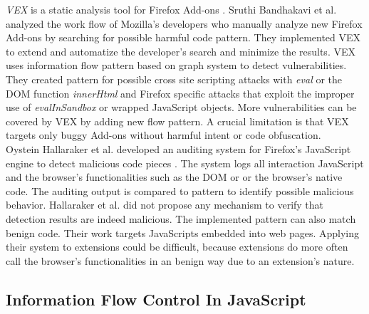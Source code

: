 		\textit{VEX} is a static analysis tool for Firefox Add-ons \cite{Bandhakavi:2011:VBE:1995376.1995398}. Sruthi Bandhakavi et al. analyzed the work flow of Mozilla's developers who manually analyze new Firefox Add-ons by searching for possible harmful code pattern. They implemented VEX to extend and automatize the developer's search and minimize the results. VEX uses information flow pattern based on graph system to detect vulnerabilities. They created pattern for possible cross site scripting attacks with \textit{eval} or the DOM function \textit{innerHtml} and Firefox specific attacks that exploit the improper use of \textit{evalInSandbox} or wrapped JavaScript objects. More vulnerabilities can be covered by VEX by adding new flow pattern. A crucial limitation is that VEX targets only buggy Add-ons without harmful intent or code obfuscation. \\
		
		Oystein Hallaraker et al. developed an auditing system for Firefox's JavaScript engine to detect malicious code pieces \cite{Hallaraker:2005:DMJ:1078029.1078861}. The system logs all interaction JavaScript and the browser's functionalities such as the DOM or or the browser's native code. The auditing output is compared to pattern to identify possible malicious behavior. Hallaraker et al. did not propose any mechanism to verify that detection results are indeed malicious. The implemented pattern can also match benign code. Their work targets JavaScripts embedded into web pages. Applying their system to extensions could be difficult, because extensions do more often call the browser's functionalities in an benign way due to an extension's nature. \\
	
	\subsection{Information Flow Control In JavaScript}
		
